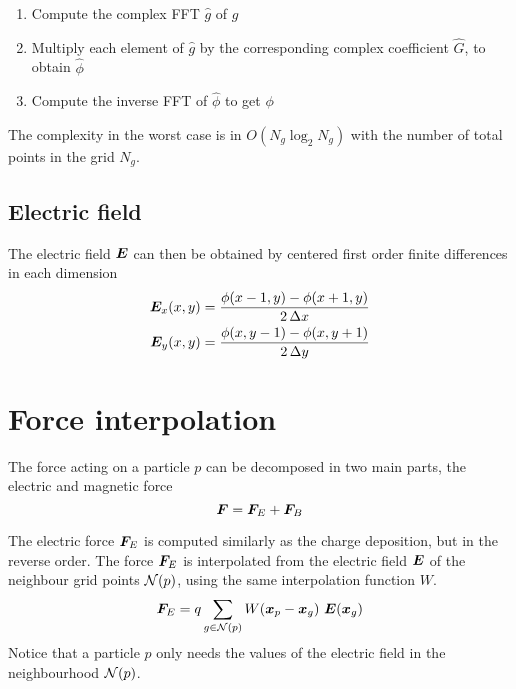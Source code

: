 %
\begin{enumerate}
\item Compute the complex FFT $\hat g$ of $g$
\item Multiply each element of $\hat g$ by the corresponding complex coefficient 
$\hat G$, to obtain $\hat \phi$
\item Compute the inverse FFT of $\hat \phi$ to get $\phi$
\end{enumerate}
%
The complexity in the worst case is in $O(N_g \log_2 N_g)$ with the number of 
total points in the grid $N_g$.

\subsection{Electric field}
The electric field $\bm{E}$ can then be obtained by centered first order finite 
differences in each dimension
%
\begin{equation}%
\begin{split}
\label{eq:phi-to-E}
\E_x(x,y) &= \frac{\phi(x-1,y) - \phi(x+1,y)}{2\,\Delta x} \\
\E_y(x,y) &= \frac{\phi(x,y-1) - \phi(x,y+1)}{2\,\Delta y}
\end{split}
\end{equation}%
%

\section{Force interpolation}

The force acting on a particle $p$ can be decomposed in two main parts, the 
electric and magnetic force
\begin{equation}
\label{eq:force}
\bm{F}=\bm{F}_E + \bm{F}_B
\end{equation}

The electric force $\bm{F}_E$ is computed similarly as the charge deposition, but in 
the reverse order. The force $\bm{F}_E$ is interpolated from the electric field $\bm{E}$ 
of the neighbour grid points $\mathcal{N}(p)$, using the same interpolation function 
$W$.
\begin{equation}%
\begin{split}
\F_E &= q \sum_{g \in \neigh{p}} W(\x_p - \x_g)\ \E(\x_g) \\
\end{split}
\end{equation}%
Notice that a particle $p$ only needs the values of the electric field in the 
neighbourhood $\mathcal{N}(p)$.


